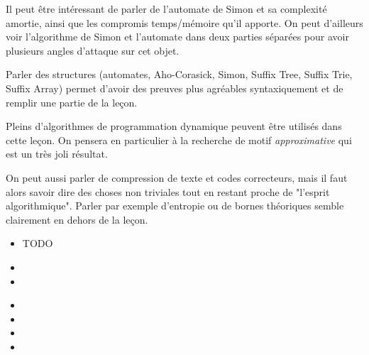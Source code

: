 \documentclass{article}
\begin{document}
Il peut être intéressant de parler de l'automate de Simon et 
sa complexité amortie, ainsi que les compromis temps/mémoire
qu'il apporte. On peut d'ailleurs voir l'algorithme de Simon
et l'automate dans deux parties séparées pour avoir plusieurs 
angles d'attaque sur cet objet.

Parler des structures (automates, Aho-Corasick, Simon,
Suffix Tree, Suffix Trie, Suffix Array) permet d'avoir 
des preuves plus agréables syntaxiquement et de remplir 
une partie de la leçon.

Pleins d'algorithmes de programmation dynamique peuvent 
être utilisés dans cette leçon. On pensera en particulier 
à la recherche de motif \emph{approximative} qui est un 
très joli résultat.

On peut aussi parler de compression de texte et codes 
correcteurs, mais il faut
alors savoir dire des choses non triviales tout en restant 
proche de "l'esprit algorithmique". Parler par exemple 
d'entropie ou de bornes théoriques semble clairement 
en dehors de la leçon.

\secquestionsclassiques

\begin{itemize}
    \item TODO
\end{itemize}

\secreferences

\begin{itemize}
\item {}
\item {}
\end{itemize}

\secdev

\begin{itemize}
    \item {}
    \item {}
    \item {}
    \item {}
\end{itemize}
\end{document}
